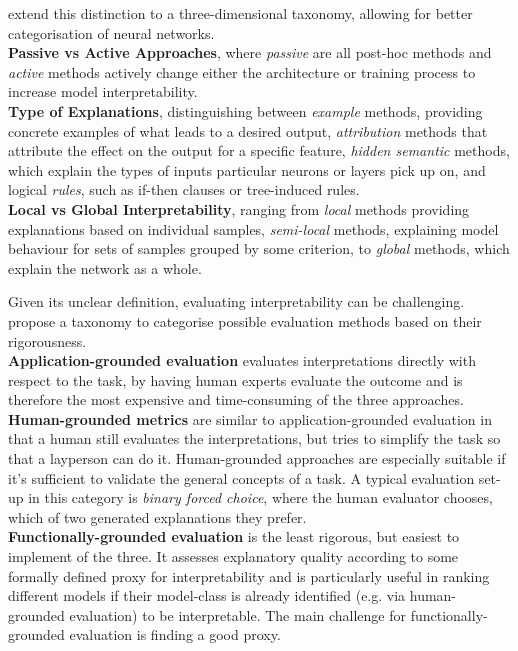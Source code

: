 \documentclass[twoside,11pt]{article}
\begin{document}
\citet[pp. 728f]{survey_NN_interpretability} extend this distinction to a three-dimensional taxonomy, allowing for better categorisation of neural networks.
\\
\textbf{Passive vs Active Approaches}, where \textit{passive} are all post-hoc methods and \textit{active} methods actively change either the architecture or
training process to increase model interpretability.
\\
\textbf{Type of Explanations}, distinguishing between \textit{example} methods, providing concrete examples of what leads to a desired output, \textit{attribution}
methods that attribute the effect on the output for a specific feature, \textit{hidden semantic} methods, which explain the types of inputs particular neurons or layers
pick up on, and logical \textit{rules}, such as if-then clauses or tree-induced rules.
\\
\textbf{Local vs Global Interpretability}, ranging from \textit{local} methods providing explanations based on individual samples, \textit{semi-local} methods,
explaining model behaviour for sets of samples grouped by some criterion, to \textit{global} methods, which explain the network as a whole.

Given its unclear definition, evaluating interpretability can be challenging. \citet[pp. 4-6]{DoshiVelez2017TowardsAR} propose a taxonomy to categorise
possible evaluation methods based on their rigorousness.
\\
\textbf{Application-grounded evaluation} evaluates interpretations directly with respect to the task, by having human experts evaluate the outcome and
is therefore the most expensive and time-consuming of the three approaches.
\\
\textbf{Human-grounded metrics} are similar to application-grounded evaluation in that a human still evaluates the interpretations, but tries to simplify the task
so that a layperson can do it. Human-grounded approaches are especially suitable if it's sufficient to validate the general concepts of a task. A typical evaluation
set-up in this category is \textit{binary forced choice}, where the human evaluator chooses, which of two generated explanations they prefer.
\\
\textbf{Functionally-grounded evaluation} is the least rigorous, but easiest to implement of the three. It assesses explanatory quality according to some
formally defined proxy for interpretability and is particularly useful in ranking different models if their model-class is already identified
(e.g. via human-grounded evaluation) to be interpretable. The main challenge for functionally-grounded evaluation is finding a good proxy.
\end{document}
